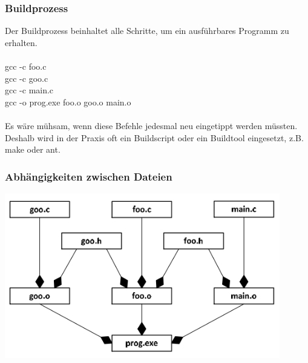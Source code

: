 			\begin{minipage}[t]{9 cm}	
				\subsubsection{Buildprozess}
					Der Buildprozess beinhaltet alle Schritte, um ein ausführbares Programm zu erhalten.\\\\
					gcc -c foo.c\\
					gcc -c goo.c\\
					gcc -c main.c\\
					gcc -o prog.exe foo.o goo.o main.o\\\\
					Es wäre mühsam, wenn diese Befehle jedesmal neu eingetippt werden müssten. Deshalb wird in der Praxis oft ein Buildscript oder ein Buildtool eingesetzt, z.B. make oder ant.
			\end{minipage}
			\hspace*{0.5cm}	
			\begin{minipage}[t]{9 cm}
				\subsubsection{Abhängigkeiten zwischen Dateien}
					\includegraphics[width=0.9\textwidth]{pics/Abhaengigkeiten_Dateien.png}
			\end{minipage}\\\\
